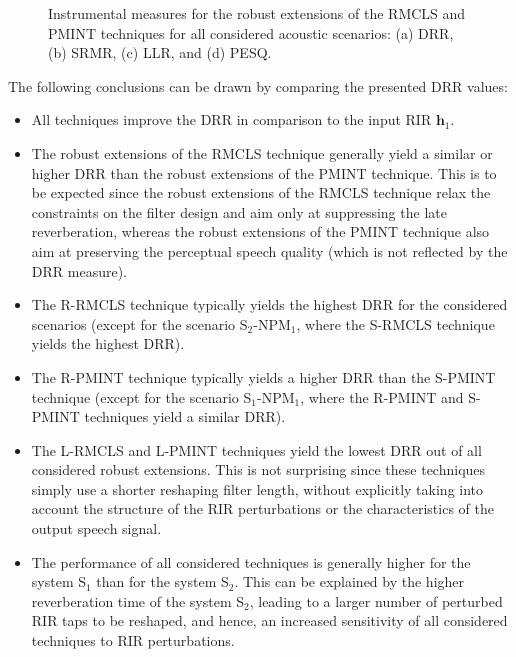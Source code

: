 \documentclass[fleqn]{aes2e}
\begin{document}
\begin{figure}[t!]
%
\vspace{-0.3cm}
  \caption{Instrumental measures for the robust extensions of the RMCLS and PMINT techniques for all considered acoustic scenarios: (a) DRR, (b) SRMR, (c) LLR, and (d) PESQ.}
  \label{fig: objective}
\end{figure}
The following conclusions can be drawn by comparing the presented DRR values:
\begin{itemize}
\item All techniques improve the DRR in comparison to the input RIR $\mathbf{h}_1$.
\item The robust extensions of the RMCLS technique generally yield a similar or higher DRR than the robust extensions of the PMINT technique.
This is to be expected since the robust extensions of the RMCLS technique relax the constraints on the filter design and aim only at suppressing the late reverberation, whereas the robust extensions of the PMINT technique also aim at preserving the perceptual speech quality (which is not reflected by the DRR measure).
\item The R-RMCLS technique typically yields the highest DRR for the considered scenarios (except for the scenario S$_2$-NPM$_1$, where the S-RMCLS technique yields the highest DRR).
\item The R-PMINT technique typically yields a higher DRR than the S-PMINT technique (except for the scenario S$_1$-NPM$_1$, where the R-PMINT and S-PMINT techniques yield a similar DRR).
\item The L-RMCLS and L-PMINT techniques yield the lowest DRR out of all considered robust extensions. 
This is not surprising since these techniques simply use a shorter reshaping filter length, without explicitly taking into account the structure of the RIR perturbations or the characteristics of the output speech signal.
\item The performance of all considered techniques is generally higher for the system S$_1$ than for the system S$_2$. 
This can be explained by the higher reverberation time of the system S$_2$, leading to a larger number of perturbed RIR taps to be reshaped, and hence, an increased sensitivity of all considered techniques to RIR perturbations.
\end{itemize} 
\end{document}
